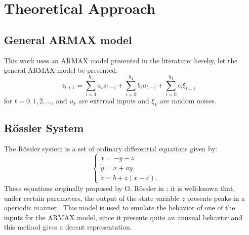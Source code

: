 \section{Theoretical Approach}\label{sec:theo}
\subsection{General ARMAX model}
This work uses an ARMAX model presented in the literature; hereby, let the general ARMAX model be presented:
\begin{equation}
    z_{t+1}=\sum_{i=0}^{h_1}a_iz_{t-i}+\sum_{i=0}^{h_2}b_iu_{t-i}+\sum_{i=0}^{h_3}c_i\xi_{t-i}
\end{equation}
for $t=0,1,2,\ldots$, and $u_k$ are external inputs and $\xi_k$ are random noises.

\subsection{R\"ossler System}
The R\"ossler system is a set of ordinary differential equations given by:
\begin{equation}
  \begin{cases}
    \dot{x}=-y-z&\\
    \dot{y}=x+ay&\\
    \dot{z}=b+z(x-c).&
  \end{cases}
\end{equation}
These equations originally proposed by O. R\"ossler in \cite{rossler1976equation}; it is well-known that, under certain parameters, the output of the state variable $z$ presents peaks in a aperiodic manner \cite{canals2014random}. This model is used to emulate the behavior of one of the inputs for the ARMAX model, since it presents quite an unusual behavior and this method gives a decent representation.
